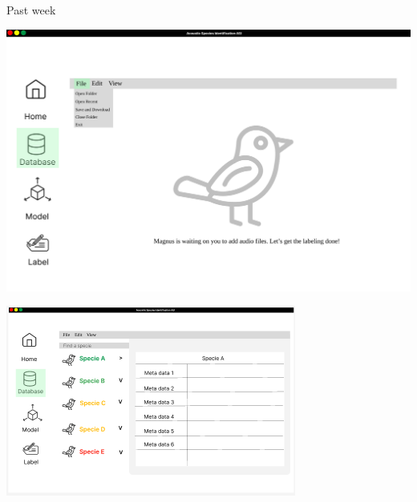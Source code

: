 \begin{frame}{Past week}
    \begin{minipage}[b]{0.45\textwidth}
        \centering
        \includegraphics[width=\textwidth]{images/sampleui2.png}
    \end{minipage}
    \hspace{0.05\textwidth}
    \begin{minipage}[b]{0.45\textwidth}
        \centering
        \includegraphics[width=\textwidth]{images/sampleui5.png}
    \end{minipage}
\end{frame}

